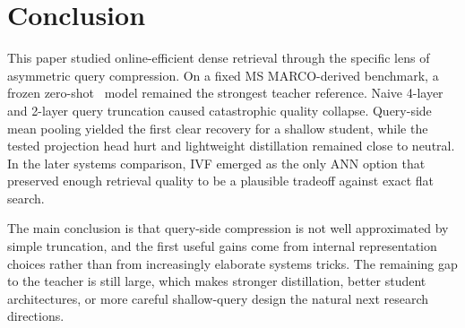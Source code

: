 \section{Conclusion}

This paper studied online-efficient dense retrieval through the specific lens of asymmetric query compression. On a fixed MS MARCO-derived benchmark, a frozen zero-shot \bgebase\ model remained the strongest teacher reference. Naive 4-layer and 2-layer query truncation caused catastrophic quality collapse. Query-side mean pooling yielded the first clear recovery for a shallow student, while the tested projection head hurt and lightweight distillation remained close to neutral. In the later systems comparison, IVF emerged as the only ANN option that preserved enough retrieval quality to be a plausible tradeoff against exact flat search.

The main conclusion is that query-side compression is not well approximated by simple truncation, and the first useful gains come from internal representation choices rather than from increasingly elaborate systems tricks. The remaining gap to the teacher is still large, which makes stronger distillation, better student architectures, or more careful shallow-query design the natural next research directions.
